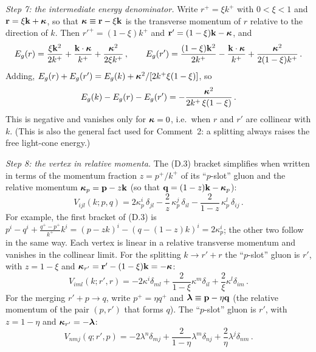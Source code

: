 \emph{Step 7: the intermediate energy denominator.} Write $r^+=\xi k^+$ with $0<\xi<1$ and $\mathbf{r}=\xi\mathbf{k}+\boldsymbol\kappa$, so that $\boldsymbol\kappa\equiv\mathbf{r}-\xi\mathbf{k}$ is the transverse momentum of $r$ relative to the direction of $k$. Then $r'^+=(1-\xi)k^+$ and $\mathbf r'=(1-\xi)\mathbf{k}-\boldsymbol\kappa$, and
\[
E_g(r)=\frac{\xi\mathbf{k}^2}{2k^+}+\frac{\mathbf{k}\cdot\boldsymbol\kappa}{k^+}+\frac{\boldsymbol\kappa^2}{2\xi k^+}\,,\qquad
E_g(r')=\frac{(1-\xi)\mathbf{k}^2}{2k^+}-\frac{\mathbf{k}\cdot\boldsymbol\kappa}{k^+}+\frac{\boldsymbol\kappa^2}{2(1-\xi)k^+}\,.
\]
Adding, $E_g(r)+E_g(r')=E_g(k)+\boldsymbol\kappa^2/[2k^+\xi(1-\xi)]$, so
\begin{equation}
E_g(k)-E_g(r)-E_g(r')=-\frac{\boldsymbol\kappa^2}{2k^+\,\xi(1-\xi)}\,.
\label{III:Esplit}
\end{equation}
This is negative and vanishes only for $\boldsymbol\kappa=0$, i.e.\ when $r$ and $r'$ are collinear with $k$. (This is also the general fact used for Comment~2: a splitting always raises the free light-cone energy.)

\emph{Step 8: the vertex in relative momenta.} The (D.3) bracket simplifies when written in terms of the momentum fraction $z=p^+/k^+$ of its ``$p$-slot'' gluon and the relative momentum $\boldsymbol\kappa_p=\mathbf{p}-z\mathbf{k}$ (so that $\mathbf{q}=(1-z)\mathbf{k}-\boldsymbol\kappa_p$):
\begin{equation}
V_{ijl}(k;p,q)=2\kappa_p^i\,\delta_{jl}-\frac{2}{z}\,\kappa_p^j\,\delta_{il}-\frac{2}{1-z}\,\kappa_p^l\,\delta_{ij}\,.
\label{III:Vrel}
\end{equation}
For example, the first bracket of (D.3) is $p^i-q^i+\frac{q^+-p^+}{k^+}k^i=(p-zk)^i-(q-(1-z)k)^i=2\kappa_p^i$; the other two follow in the same way. Each vertex is linear in a relative transverse momentum and vanishes in the collinear limit.
For the splitting $k\to r'+r$ the ``$p$-slot'' gluon is $r'$, with $z=1-\xi$ and $\boldsymbol\kappa_{r'}=\mathbf r'-(1-\xi)\mathbf{k}=-\boldsymbol\kappa$:
\begin{equation}
V_{iml}(k;r',r)=-2\kappa^i\delta_{ml}+\frac{2}{1-\xi}\kappa^m\delta_{il}+\frac{2}{\xi}\kappa^l\delta_{im}\,.
\label{III:V1}
\end{equation}
For the merging $r'+p\to q$, write $p^+=\eta q^+$ and $\boldsymbol\lambda\equiv\mathbf{p}-\eta\mathbf{q}$ (the relative momentum of the pair $(p,r')$ that forms $q$). The ``$p$-slot'' gluon is $r'$, with $z=1-\eta$ and $\boldsymbol\kappa_{r'}=-\boldsymbol\lambda$:
\begin{equation}
V_{nmj}(q;r',p)=-2\lambda^n\delta_{mj}+\frac{2}{1-\eta}\lambda^m\delta_{nj}+\frac{2}{\eta}\lambda^j\delta_{nm}\,.
\label{III:V2}
\end{equation}

